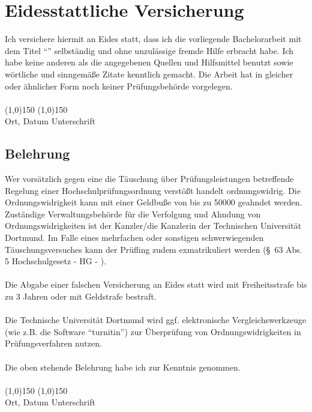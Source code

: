 \makebibliography
\newpage

\thispagestyle{empty}
\section*{Eidesstattliche Versicherung}
\noindent
Ich versichere hiermit an Eides statt, dass ich die vorliegende Bachelorarbeit mit dem Titel \enquote{\thetitle} selbständig und ohne unzulässige fremde Hilfe erbracht habe.
Ich habe keine anderen als die angegebenen Quellen und Hilfsmittel benutzt sowie wörtliche und sinngemäße Zitate kenntlich gemacht.
Die Arbeit hat in gleicher oder ähnlicher Form noch keiner Prüfungsbehörde vorgelegen.
\vspace*{1cm}
\ \\
\ \\
\line(1,0){150} \hfill \line(1,0){150} \\
Ort, Datum \hfill Unterschrift \hspace*{3cm}
\vspace*{1.5cm}

\subsection*{Belehrung}
Wer vorsätzlich gegen eine die Täuschung über Prüfungsleistungen betreffende Regelung einer Hochschulprüfungsordnung verstößt handelt ordnungswidrig.
Die Ordnungswidrigkeit kann mit einer Geldbuße von bis zu \SI[round-mode=places, round-precision=2]{50000}{\officialeuro} geahndet werden.
Zuständige Verwaltungsbehörde für die Verfolgung und Ahndung von Ordnungswidrigkeiten ist der Kanzler/die Kanzlerin der Technischen Universität Dortmund.
Im Falle eines mehrfachen oder sonstigen schwerwiegenden Täuschungsversuches kann der Prüfling zudem exmatrikuliert werden (\S\ 63 Abs. 5 Hochschulgesetz - HG - ). \\
\ \\
Die Abgabe einer falschen Versicherung an Eides statt wird mit Freiheitsstrafe bis zu 3 Jahren oder mit Geldstrafe bestraft. \\
\ \\
Die Technische Universität Dortmund wird ggf. elektronische Vergleichswerkzeuge (wie z.B. die Software \enquote{turnitin}) zur Überprüfung von Ordnungswidrigkeiten in Prüfungsverfahren nutzen. \\
\ \\
Die oben stehende Belehrung habe ich zur Kenntnis genommen.
\vspace*{1cm}
\ \\
\ \\
\line(1,0){150} \hfill \line(1,0){150}\\
Ort, Datum \hfill Unterschrift \hspace*{3cm}
